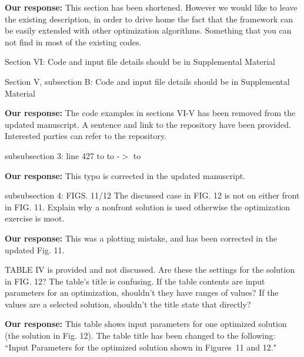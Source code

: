 \documentclass{article}
\begin{document}
{\bf Our response: } {\color{blue} This section has been shortened. However we would like to 
leave the existing description, in order to drive home the fact that the framework can be 
easily extended with other optimization algorithms. Something that you can not find in most of the 
existing codes.}

Section VI: 
Code and input file details should be in Supplemental Material

Section V, subsection B:
Code and input file details should be in Supplemental Material

{\bf Our response:} {\color{blue} The code examples in sections VI-V has been removed from the updated manuscript. 
	A sentence and link to the repository have been provided. Interested parties can refer to the repository.}

subsubsection 3:
line 427 to to -$>$ to

{\bf Our response:} {\color{blue} This typo is corrected in the updated manuscript.}

subsubsection 4:
FIGS. 11/12 The discussed case in FIG. 12 is not on either front in
FIG. 11. Explain why a nonfront solution is used otherwise the
optimization exercise is moot.

{\bf Our response:} {\color{blue} This was a plotting mistake, and has been corrected in the updated Fig. 11.}

TABLE IV is provided and not discussed. Are these the settings for the
solution in FIG. 12? The table’s title is confusing. If the table
contents are input parameters for an optimization, shouldn’t they have
ranges of values? If the values are a selected solution, shouldn’t the
title state that directly?

{\bf Our response:} {\color{blue} This table shows input parameters for one optimized solution (the solution in Fig. 12). 
The table title has been changed to the following: ``Input Parameters for the optimized solution shown in Figures~11 and 12."}


 
\end{document}
